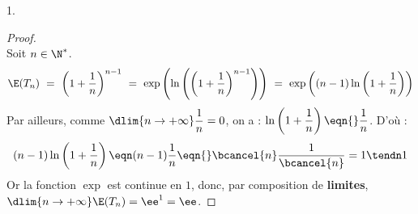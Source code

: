\begin{noliste}{1.}
  \begin{proof}~\\
    Soit $n\in\N^*$.
    \[
    \E(T_n) \ = \ \left(1+\dfrac{1}{n}\right)^{n-1}
    \ = \ \exp \left(\ln\left(\left(1+\dfrac{1}{n}\right)^{n-1} 
      \right)\right)
    \ = \ \exp\left( (n-1) \ln\left( 1+\dfrac{1}{n}\right)\right)
    \]
    Par ailleurs, comme $\dlim{n\to+\infty}\dfrac{1}{n} = 0$, on a :
    $\ln\left(1+\dfrac{1}{n}\right) \eqn{} \dfrac{1}{n}$.
    D'où :
    \[
    (n-1)\ln\left(1+\dfrac{1}{n}\right) \eqn (n-1)\dfrac{1}{n} \eqn{}
    \bcancel{n}\dfrac{1}{\bcancel{n}} = 1 \tendn 1
    \]
    Or la fonction $\exp$ est continue en $1$, donc, par composition
    de {\bf limites}, $\dlim{n\to+\infty} \E(T_n) = \ee^1 = \ee$.%
    
    
    \newpage



\end{proof}
\end{noliste}
